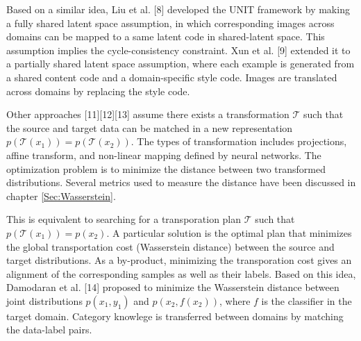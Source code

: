 \documentclass{article}
\begin{document}
Based on a similar idea, Liu et al. [8] developed the UNIT framework by making a fully shared latent space assumption, in which corresponding images across domains can be mapped to a same latent code in shared-latent space. This assumption implies the cycle-consistency constraint. Xun et al. [9] extended it to a partially shared latent space assumption, where each example is generated from a shared content code and a domain-specific style code. Images are translated across domains by replacing the style code.


Other approaches [11][12][13] assume there exists a transformation $\mathcal{T}$ such that the source and target data can be matched in a new representation $p(\mathcal{T}(x_1)) = p(\mathcal{T}(x_2))$. The types of transformation includes projections, affine transform, and non-linear mapping defined by neural networks. The optimization problem is to minimize the distance between two transformed distributions. Several metrics used to measure the distance have been discussed in chapter \ref{Sec:Wasserstein}. 


This is equivalent to searching for a transporation plan $\mathcal{T}$ such that $p(\mathcal{T}(x_1)) = p(x_2)$. A particular solution is the optimal plan that minimizes the global transportation cost (Wasserstein distance) between the source and target distributions. As a by-product, minimizing the transporation cost gives an alignment of the corresponding samples as well as their labels. Based on this idea, Damodaran et al. [14] proposed to minimize the Wasserstein distance between joint distributions $p(x_1, y_1)$ and $p(x_2, f(x_2))$, where $f$ is the classifier in the target domain. Category knowlege is transferred between domains by matching the data-label pairs.
\end{document}
